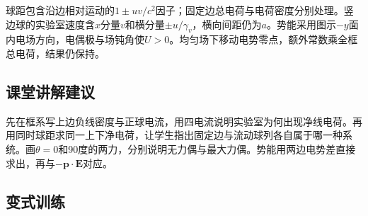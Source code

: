 \documentclass[UTF8,fontset=fandol,a4paper,11pt]{ctexart}
\begin{document}
球距包含沿边相对运动的$1\pm uv/c^2$因子；固定边总电荷与电荷密度分别处理。竖边球的实验室速度含$x$分量$v$和横分量$\pm u/\gamma_v$，横向间距仍为$a$。势能采用图示$-y$面内电场方向，电偶极与场钝角使$U>0$。均匀场下移动电势零点，额外常数乘全框总电荷，结果仍保持。



\subsection*{课堂讲解建议}

先在框系写上边负线密度与正球电流，用四电流说明实验室为何出现净线电荷。再用同时球距求同一上下净电荷，让学生指出固定边与流动球列各自属于哪一种系统。画$\theta=0$和90度的两力，分别说明无力偶与最大力偶。势能用两边电势差直接求出，再与$-\boldsymbol p\cdot\boldsymbol E$对应。



\subsection*{变式训练}
\end{document}
